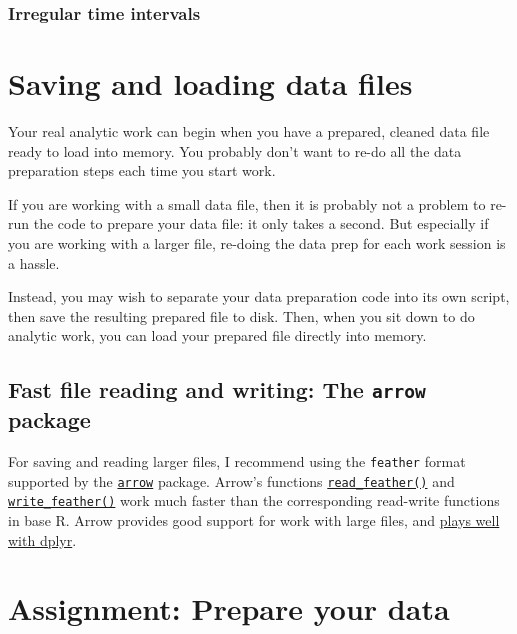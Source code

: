 \documentclass[
]{book}
\begin{document}
\hypertarget{irregular-time-intervals}{%
\subsection{Irregular time intervals}\label{irregular-time-intervals}}

\hypertarget{saving-and-loading-data-files}{%
\chapter{Saving and loading data files}\label{saving-and-loading-data-files}}

Your real analytic work can begin when you have a prepared, cleaned data file ready to load into memory. You probably don't want to re-do all the data preparation steps each time you start work.

If you are working with a small data file, then it is probably not a problem to re-run the code to prepare your data file: it only takes a second. But especially if you are working with a larger file, re-doing the data prep for each work session is a hassle.

Instead, you may wish to separate your data preparation code into its own script, then save the resulting prepared file to disk. Then, when you sit down to do analytic work, you can load your prepared file directly into memory.

\hypertarget{fast-file-reading-and-writing-the-arrow-package}{%
\section{\texorpdfstring{Fast file reading and writing: The \texttt{arrow} package}{Fast file reading and writing: The arrow package}}\label{fast-file-reading-and-writing-the-arrow-package}}

For saving and reading larger files, I recommend using the \texttt{feather} format supported by the \href{https://arrow.apache.org/docs/r/articles/arrow.html}{\texttt{arrow}} package. Arrow's functions \href{https://arrow.apache.org/docs/r/reference/read_feather.html}{\texttt{read\_feather()}} and \href{https://arrow.apache.org/docs/r/reference/write_feather.html}{\texttt{write\_feather()}} work much faster than the corresponding read-write functions in base R. Arrow provides good support for work with large files, and \href{https://arrow.apache.org/docs/r/articles/dataset.html}{plays well with dplyr}.

\hypertarget{assignment-prepare-your-data}{%
\chapter{Assignment: Prepare your data}\label{assignment-prepare-your-data}}
\end{document}
